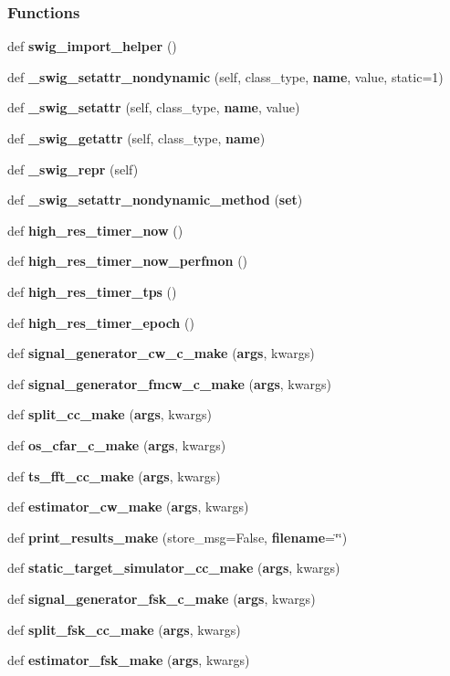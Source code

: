 \subsubsection*{Functions}
\begin{DoxyCompactItemize}
\item 
def {\bf swig\+\_\+import\+\_\+helper} ()
\item 
def {\bf \+\_\+swig\+\_\+setattr\+\_\+nondynamic} (self, class\+\_\+type, {\bf name}, value, static=1)
\item 
def {\bf \+\_\+swig\+\_\+setattr} (self, class\+\_\+type, {\bf name}, value)
\item 
def {\bf \+\_\+swig\+\_\+getattr} (self, class\+\_\+type, {\bf name})
\item 
def {\bf \+\_\+swig\+\_\+repr} (self)
\item 
def {\bf \+\_\+swig\+\_\+setattr\+\_\+nondynamic\+\_\+method} ({\bf set})
\item 
def {\bf high\+\_\+res\+\_\+timer\+\_\+now} ()
\item 
def {\bf high\+\_\+res\+\_\+timer\+\_\+now\+\_\+perfmon} ()
\item 
def {\bf high\+\_\+res\+\_\+timer\+\_\+tps} ()
\item 
def {\bf high\+\_\+res\+\_\+timer\+\_\+epoch} ()
\item 
def {\bf signal\+\_\+generator\+\_\+cw\+\_\+c\+\_\+make} ({\bf args}, kwargs)
\item 
def {\bf signal\+\_\+generator\+\_\+fmcw\+\_\+c\+\_\+make} ({\bf args}, kwargs)
\item 
def {\bf split\+\_\+cc\+\_\+make} ({\bf args}, kwargs)
\item 
def {\bf os\+\_\+cfar\+\_\+c\+\_\+make} ({\bf args}, kwargs)
\item 
def {\bf ts\+\_\+fft\+\_\+cc\+\_\+make} ({\bf args}, kwargs)
\item 
def {\bf estimator\+\_\+cw\+\_\+make} ({\bf args}, kwargs)
\item 
def {\bf print\+\_\+results\+\_\+make} (store\+\_\+msg=False, {\bf filename}=\char`\"{}\char`\"{})
\item 
def {\bf static\+\_\+target\+\_\+simulator\+\_\+cc\+\_\+make} ({\bf args}, kwargs)
\item 
def {\bf signal\+\_\+generator\+\_\+fsk\+\_\+c\+\_\+make} ({\bf args}, kwargs)
\item 
def {\bf split\+\_\+fsk\+\_\+cc\+\_\+make} ({\bf args}, kwargs)
\item 
def {\bf estimator\+\_\+fsk\+\_\+make} ({\bf args}, kwargs)

\end{DoxyCompactItemize}
